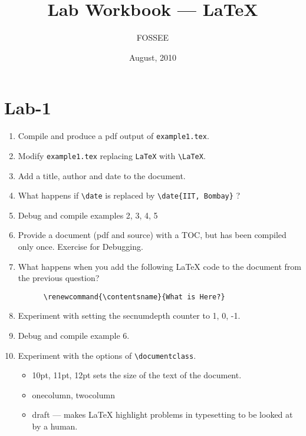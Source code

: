 \documentclass[11pt]{article}
\title{Lab Workbook --- \LaTeX}
\author{FOSSEE}
\date{August, 2010}
\begin{document}
\maketitle

\setcounter{tocdepth}{3}
\tableofcontents
\vspace*{1cm}

\section{Lab-1}
\label{sec-1}


\begin{enumerate}
\item Compile and produce a pdf output of \texttt{example1.tex}.
\item Modify \texttt{example1.tex} replacing \texttt{LaTeX} with \texttt{\textbackslash{}LaTeX}.
\item Add a title, author and date to the document.
\item What happens if \texttt{\textbackslash{}date} is replaced by \texttt{\textbackslash{}date\{IIT, Bombay\}} ?
\item Debug and compile examples 2, 3, 4, 5
\item Provide a document (pdf and source) with a TOC, but has been
     compiled only once. Exercise for Debugging.
\item What happens when you add the following \LaTeX{} code to the
     document from the previous question? 
     
\begin{verbatim}
      \renewcommand{\contentsname}{What is Here?}
\end{verbatim}

\item Experiment with setting the secnumdepth counter to 1, 0, -1.
\item Debug and compile example 6.
\item Experiment with the options of \texttt{\textbackslash{}documentclass}.

\begin{itemize}
\item 10pt, 11pt, 12pt sets the size of the text of the document.
\item onecolumn, twocolumn
\item draft --- makes \LaTeX{} highlight problems in typesetting to
        be looked at by a human.
\end{itemize}

\end{enumerate}
\end{document}
